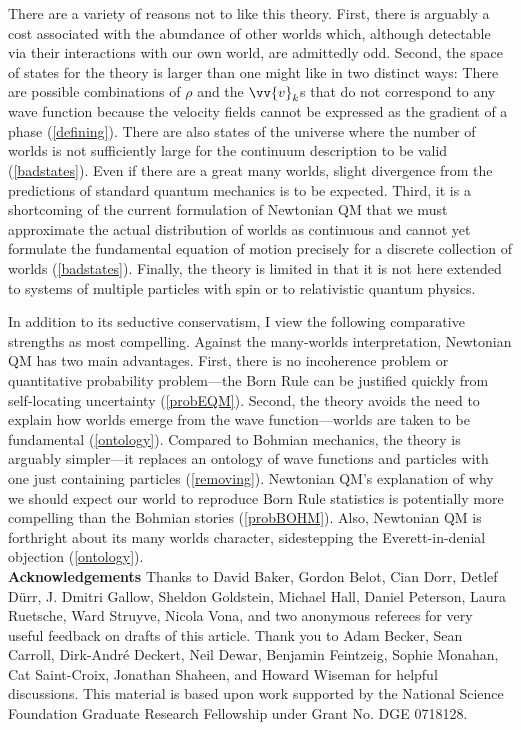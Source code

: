 \documentclass[onecolumn,secnumarabic,balancelastpage,amsmath,amssymb,nofootinbib]{article}
\begin{document}
There are a variety of reasons not to like this theory.  First, there is arguably a cost associated with the abundance of other worlds which, although detectable via their interactions with our own world, are admittedly odd.  Second, the space of states for the theory is larger than one might like in two distinct ways:  There are possible combinations of $\rho$ and the $\vv{v}_k$s that do not correspond to any wave function because the velocity fields cannot be expressed as the gradient of a phase (\textsection \ref{defining}).  There are also states of the universe where the number of worlds is not sufficiently large for the continuum description to be valid (\textsection \ref{badstates}).  Even if there are a great many worlds, slight divergence from the predictions of standard quantum mechanics is to be expected.  Third, it is a shortcoming of the current formulation of Newtonian QM that we must approximate the actual distribution of worlds as continuous and cannot yet formulate the fundamental equation of motion precisely for a discrete collection of worlds (\textsection \ref{badstates}).  Finally, the theory is limited in that it is not here extended to systems of multiple particles with spin or to relativistic quantum physics.

In addition to its seductive conservatism, I view the following comparative strengths as most compelling.  Against the many-worlds interpretation, Newtonian QM has two main advantages.  First, there is no incoherence problem or quantitative probability problem---the Born Rule can be justified quickly from self-locating uncertainty (\textsection \ref{probEQM}).  Second, the theory avoids the need to explain how worlds emerge from the wave function---worlds are taken to be fundamental (\textsection \ref{ontology}).  Compared to Bohmian mechanics, the theory is arguably simpler---it replaces an ontology of wave functions and particles with one just containing particles (\textsection \ref{removing}).  Newtonian QM's explanation of why we should expect our world to reproduce Born Rule statistics is potentially more compelling than the Bohmian stories (\textsection \ref{probBOHM}).  Also, Newtonian QM is forthright about its many worlds character, sidestepping the Everett-in-denial objection (\textsection \ref{ontology}).\\

\textbf{Acknowledgements}
Thanks to David Baker, Gordon Belot, Cian Dorr, Detlef D\"{u}rr, J. Dmitri Gallow, Sheldon Goldstein, Michael Hall, Daniel Peterson, Laura Ruetsche, Ward Struyve, Nicola Vona, and two anonymous referees for very useful feedback on drafts of this article.  Thank you to Adam Becker, Sean Carroll, Dirk-Andr\'{e} Deckert, Neil Dewar, Benjamin Feintzeig, Sophie Monahan, Cat Saint-Croix, Jonathan Shaheen, and Howard Wiseman for helpful discussions.  This material is based upon work supported by the National Science Foundation Graduate Research Fellowship under Grant No. DGE 0718128.


\end{document}
